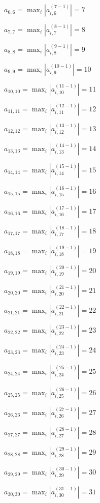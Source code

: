 \documentclass[a4paper,12pt]{article}
\begin{document}
$a _{ 6, 6 } =  \max _i |a _{ i, 6 } ^{ (7 - 1) } | = 7$

$a _{ 7, 7 } =  \max _i |a _{ i, 7 } ^{ (8 - 1) } | = 8$

$a _{ 8, 8 } =  \max _i |a _{ i, 8 } ^{ (9 - 1) } | = 9$

$a _{ 9, 9 } =  \max _i |a _{ i, 9 } ^{ (10 - 1) } | = 10$

$a _{ 10, 10 } =  \max _i |a _{ i, 10 } ^{ (11 - 1) } | = 11$

$a _{ 11, 11 } =  \max _i |a _{ i, 11 } ^{ (12 - 1) } | = 12$

$a _{ 12, 12 } =  \max _i |a _{ i, 12 } ^{ (13 - 1) } | = 13$

$a _{ 13, 13 } =  \max _i |a _{ i, 13 } ^{ (14 - 1) } | = 14$

$a _{ 14, 14 } =  \max _i |a _{ i, 14 } ^{ (15 - 1) } | = 15$

$a _{ 15, 15 } =  \max _i |a _{ i, 15 } ^{ (16 - 1) } | = 16$

$a _{ 16, 16 } =  \max _i |a _{ i, 16 } ^{ (17 - 1) } | = 17$

$a _{ 17, 17 } =  \max _i |a _{ i, 17 } ^{ (18 - 1) } | = 18$

$a _{ 18, 18 } =  \max _i |a _{ i, 18 } ^{ (19 - 1) } | = 19$

$a _{ 19, 19 } =  \max _i |a _{ i, 19 } ^{ (20 - 1) } | = 20$

$a _{ 20, 20 } =  \max _i |a _{ i, 20 } ^{ (21 - 1) } | = 21$

$a _{ 21, 21 } =  \max _i |a _{ i, 21 } ^{ (22 - 1) } | = 22$

$a _{ 22, 22 } =  \max _i |a _{ i, 22 } ^{ (23 - 1) } | = 23$

$a _{ 23, 23 } =  \max _i |a _{ i, 23 } ^{ (24 - 1) } | = 24$

$a _{ 24, 24 } =  \max _i |a _{ i, 24 } ^{ (25 - 1) } | = 25$

$a _{ 25, 25 } =  \max _i |a _{ i, 25 } ^{ (26 - 1) } | = 26$

$a _{ 26, 26 } =  \max _i |a _{ i, 26 } ^{ (27 - 1) } | = 27$

$a _{ 27, 27 } =  \max _i |a _{ i, 27 } ^{ (28 - 1) } | = 28$

$a _{ 28, 28 } =  \max _i |a _{ i, 28 } ^{ (29 - 1) } | = 29$

$a _{ 29, 29 } =  \max _i |a _{ i, 29 } ^{ (30 - 1) } | = 30$

$a _{ 30, 30 } =  \max _i |a _{ i, 30 } ^{ (31 - 1) } | = 31$
\end{document}
